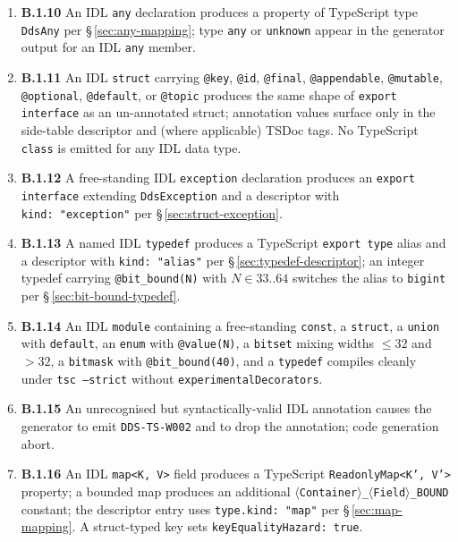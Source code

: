 \documentclass{../styles/zerodds-vendor-spec}
\begin{document}
\begin{enumerate}
  \item \textbf{B.1.10} An IDL \texttt{any} declaration produces
        a property of TypeScript type \texttt{DdsAny} per
        \S\,\ref{sec:any-mapping}; type \texttt{any} or
        \texttt{unknown}  appear in the generator
        output for an IDL \texttt{any} member.
  \item \textbf{B.1.11} An IDL \texttt{struct} carrying
        \texttt{@key}, \texttt{@id}, \texttt{@final},
        \texttt{@appendable}, \texttt{@mutable},
        \texttt{@optional}, \texttt{@default}, or \texttt{@topic}
        produces the same shape of \texttt{export interface} as
        an un-annotated struct; annotation values surface only in
        the side-table descriptor and (where applicable) TSDoc
        tags. No TypeScript \texttt{class} is emitted for any IDL
        data type.
  \item \textbf{B.1.12} A free-standing IDL \texttt{exception}
        declaration produces an \texttt{export interface}
        extending \texttt{DdsException} and a descriptor with
        \texttt{kind:\,"exception"} per
        \S\,\ref{sec:struct-exception}.
  \item \textbf{B.1.13} A named IDL \texttt{typedef} produces a
        TypeScript \texttt{export type} alias and a descriptor
        with \texttt{kind:\,"alias"} per
        \S\,\ref{sec:typedef-descriptor}; an integer typedef
        carrying \texttt{@bit\_bound(N)} with $N \in 33..64$
        switches the alias to \texttt{bigint} per
        \S\,\ref{sec:bit-bound-typedef}.
  \item \textbf{B.1.14} An IDL \texttt{module} containing a
        free-standing \texttt{const}, a \texttt{struct}, a
        \texttt{union} with \texttt{default}, an \texttt{enum}
        with \texttt{@value(N)}, a \texttt{bitset} mixing widths
        $\leq 32$ and $> 32$, a \texttt{bitmask} with
        \texttt{@bit\_bound(40)}, and a \texttt{typedef}
        compiles cleanly under \texttt{tsc --strict} without
        \texttt{experimentalDecorators}.
  \item \textbf{B.1.15} An unrecognised but syntactically-valid
        IDL annotation causes the generator to emit
        \texttt{DDS-TS-W002} and to drop the annotation; code
        generation  abort.
  \item \textbf{B.1.16} An IDL \texttt{map<K, V>} field produces
        a TypeScript \texttt{ReadonlyMap<K', V'>} property; a
        bounded map produces an additional
        \texttt{$\langle$Container$\rangle$\_$\langle$Field$\rangle$\_BOUND}
        constant; the descriptor entry uses
        \texttt{type.kind:\,"map"} per
        \S\,\ref{sec:map-mapping}. A struct-typed key sets
        \texttt{keyEqualityHazard:\,true}.
\end{enumerate}
\end{document}
